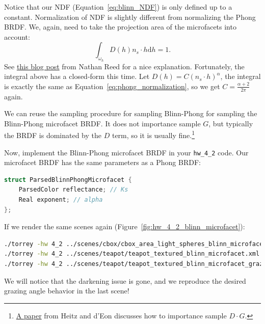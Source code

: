 Notice that our NDF (Equation~\eqref{eq:blinn_NDF}) is only defined up to a constant. Normalization of NDF is slightly different from normalizing the Phong BRDF. We, again, need to take the projection area of the microfacets into account:
\begin{equation}
\int_{\omega_h} D(h) n_s \cdot h \mathrm{d}h = 1.
\end{equation}
See \href{https://www.reedbeta.com/blog/hows-the-ndf-really-defined/}{this blog post} from Nathan Reed for a nice explanation. Fortunately, the integral above has a closed-form this time. Let $D(h) = C \left(n_s \cdot h\right)^{\alpha}$, the integral is exactly the same as Equation~\eqref{eq:phong_normalization}, so we get $C = \frac{\alpha + 2}{2\pi}$ again.

We can reuse the sampling procedure for sampling Blinn-Phong for sampling the Blinn-Phong microfacet BRDF. It does not importance sample $G$, but typically the BRDF is dominated by the $D$ term, so it is usually fine.\footnote{\href{https://hal.inria.fr/hal-00996995/en}{A paper} from Heitz and d'Eon discusses how to importance sample $D \cdot G$.}

Now, implement the Blinn-Phong microfacet BRDF in your \lstinline{hw_4_2} code. Our microfacet BRDF has the same parameters as a Phong BRDF:
\begin{lstlisting}[language=C++]
struct ParsedBlinnPhongMicrofacet {
    ParsedColor reflectance; // Ks
    Real exponent; // alpha
};
\end{lstlisting}

If we render the same scenes again (Figure~\ref{fig:hw_4_2_blinn_microfacet}):
\begin{lstlisting}[language=bash]
./torrey -hw 4_2 ../scenes/cbox/cbox_area_light_spheres_blinn_microfacet.xml
./torrey -hw 4_2 ../scenes/teapot/teapot_textured_blinn_microfacet.xml
./torrey -hw 4_2 ../scenes/teapot/teapot_textured_blinn_microfacet_grazing_view.xml
\end{lstlisting}
We will notice that the darkening issue is gone, and we reproduce the desired grazing angle behavior in the last scene!

